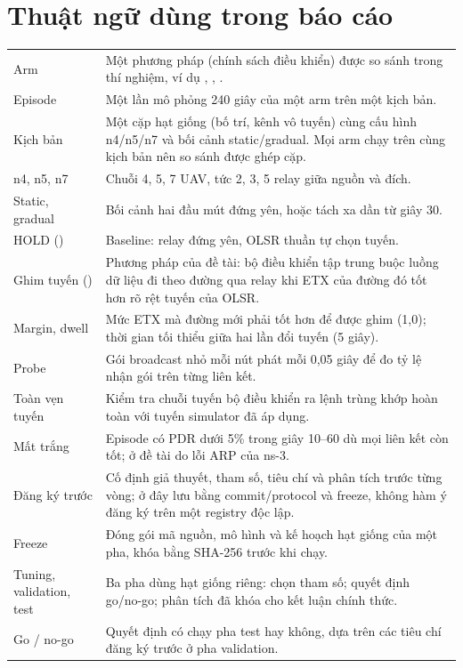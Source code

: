 \documentclass[12pt,a4paper]{report}
\newcommand{\code}[1]{\texttt{\detokenize{#1}}}
\begin{document}
\section*{Thuật ngữ dùng trong báo cáo}
{\small
\begin{longtable}{@{}P{4.2cm}p{11.2cm}@{}}
\toprule\endhead
Arm&Một phương pháp (chính sách điều khiển) được so sánh trong thí nghiệm, ví dụ \code{hold}, \code{olsr-etx}, \code{lq-route}.\\
Episode&Một lần mô phỏng 240 giây của một arm trên một kịch bản.\\
Kịch bản&Một cặp hạt giống (bố trí, kênh vô tuyến) cùng cấu hình n4/n5/n7 và bối cảnh static/gradual. Mọi arm chạy trên cùng kịch bản nên so sánh được ghép cặp.\\
n4, n5, n7&Chuỗi 4, 5, 7 UAV, tức 2, 3, 5 relay giữa nguồn và đích.\\
Static, gradual&Bối cảnh hai đầu mút đứng yên, hoặc tách xa dần từ giây 30.\\
HOLD (\code{hold})&Baseline: relay đứng yên, OLSR thuần tự chọn tuyến.\\
Ghim tuyến (\code{lq-route})&Phương pháp của đề tài: bộ điều khiển tập trung buộc luồng dữ liệu đi theo đường qua relay khi ETX của đường đó tốt hơn rõ rệt tuyến của OLSR.\\
Margin, dwell&Mức ETX mà đường mới phải tốt hơn để được ghim (1,0); thời gian tối thiểu giữa hai lần đổi tuyến (5 giây).\\
Probe&Gói broadcast nhỏ mỗi nút phát mỗi 0,05 giây để đo tỷ lệ nhận gói trên từng liên kết.\\
Toàn vẹn tuyến&Kiểm tra chuỗi tuyến bộ điều khiển ra lệnh trùng khớp hoàn toàn với tuyến simulator đã áp dụng.\\
Mất trắng&Episode có PDR dưới 5\% trong giây 10--60 dù mọi liên kết còn tốt; ở đề tài do lỗi ARP của ns-3.\\
Đăng ký trước&Cố định giả thuyết, tham số, tiêu chí và phân tích trước từng vòng; ở đây lưu bằng commit/protocol và freeze, không hàm ý đăng ký trên một registry độc lập.\\
Freeze&Đóng gói mã nguồn, mô hình và kế hoạch hạt giống của một pha, khóa bằng SHA-256 trước khi chạy.\\
Tuning, validation, test&Ba pha dùng hạt giống riêng: chọn tham số; quyết định go/no-go; phân tích đã khóa cho kết luận chính thức.\\
Go / no-go&Quyết định có chạy pha test hay không, dựa trên các tiêu chí đăng ký trước ở pha validation.\\

\end{longtable}}
\end{document}
